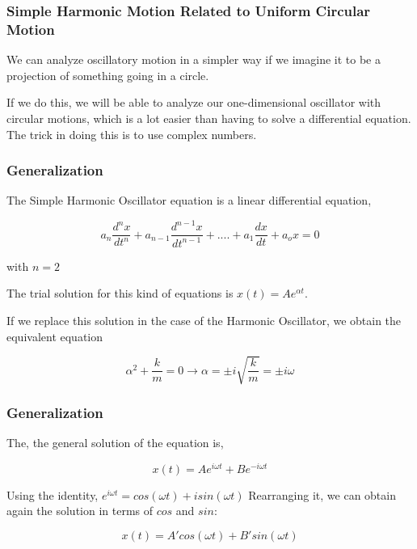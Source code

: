 \documentclass[]{beamer}
\begin{document}

\begin{frame}
\frametitle{Simple Harmonic Motion Related
to Uniform Circular Motion}

We can analyze oscillatory
motion in a simpler way if we imagine it to be a projection of something
going in a circle.

\vspace{5mm}

If we do this, we will be able to
analyze our one-dimensional oscillator with circular motions, which is a lot easier
than having to solve a differential equation. The trick in doing this is to use
complex numbers.

\end{frame}


\begin{frame}
\frametitle{Generalization}

The  Simple Harmonic Oscillator equation is  a linear differential equation, 

\begin{equation*}
a_n\frac{d^nx}{dt^n}+a_{n-1}\frac{d^{n-1}x}{dt^{n-1}}+....+a_1\frac{dx}{dt}+a_ox=0
\end{equation*}

with $n=2$
\vspace{3mm}

The trial solution for this kind of equations is $x(t)=Ae^{\alpha t}$.

\vspace{3mm}

If we replace this solution in the case of the Harmonic Oscillator, we obtain the equivalent equation


\begin{equation*}
\alpha^2+\frac{k}{m}=0\rightarrow \alpha=\pm i\sqrt{\frac{k}{m}}=\pm i\omega 
\end{equation*}

\end{frame}


\begin{frame}
\frametitle{Generalization}

The, the general solution of the equation is,

\begin{equation}
x(t)=Ae^{i\omega t}+Be^{-i\omega t}
\end{equation}


Using the identity, $e^{i\omega t}=cos(\omega t)+i sin(\omega t)$ Rearranging it, we can obtain again the solution in terms of $cos$ and $sin$:



\begin{equation}
x(t)=A'cos(\omega t)+B' sin(\omega t)
\end{equation}




\end{frame}
\end{document}
